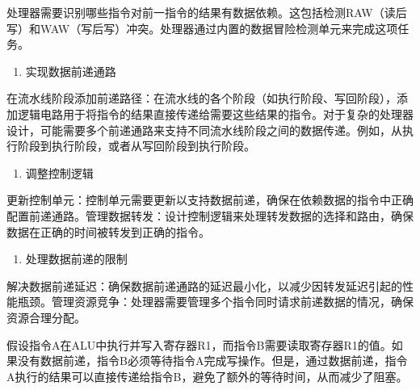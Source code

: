 处理器需要识别哪些指令对前一指令的结果有数据依赖。这包括检测RAW（读后写）和WAW（写后写）冲突。处理器通过内置的数据冒险检测单元来完成这项任务。

\begin{enumerate}
\def\labelenumi{\arabic{enumi}.}
\setcounter{enumi}{1}
\tightlist
\item
  实现数据前递通路
\end{enumerate}

在流水线阶段添加前递路径：在流水线的各个阶段（如执行阶段、写回阶段），添加逻辑电路用于将指令的结果直接传递给需要这些结果的指令。对于复杂的处理器设计，可能需要多个前递通路来支持不同流水线阶段之间的数据传递。例如，从执行阶段到执行阶段，或者从写回阶段到执行阶段。

\begin{enumerate}
\def\labelenumi{\arabic{enumi}.}
\setcounter{enumi}{2}
\tightlist
\item
  调整控制逻辑
\end{enumerate}

更新控制单元：控制单元需要更新以支持数据前递，确保在依赖数据的指令中正确配置前递通路。管理数据转发：设计控制逻辑来处理转发数据的选择和路由，确保数据在正确的时间被转发到正确的指令。

\begin{enumerate}
\def\labelenumi{\arabic{enumi}.}
\setcounter{enumi}{3}
\tightlist
\item
  处理数据前递的限制
\end{enumerate}

解决数据前递延迟：确保数据前递通路的延迟最小化，以减少因转发延迟引起的性能瓶颈。管理资源竞争：处理器需要管理多个指令同时请求前递数据的情况，确保资源合理分配。

假设指令A在ALU中执行并写入寄存器R1，而指令B需要读取寄存器R1的值。如果没有数据前递，指令B必须等待指令A完成写操作。但是，通过数据前递，指令A执行的结果可以直接传递给指令B，避免了额外的等待时间，从而减少了阻塞。
